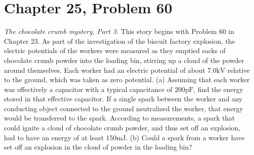 \documentclass[12pt]{article}
\begin{document}
\section{Chapter 25, Problem 60}
\textit{The chocolate crumb mystery, Part 3.} This story begins with Problem 60 in Chapter 23. As part of the investigation of the biscuit factory explosion, the electric potentials of the workers were measured as they emptied sacks of chocolate crumb powder into the loading bin, stirring up a cloud of the powder around themselves. Each worker had an electric potential of about $7.0 \unit{\kilo\volt}$ relative to the ground, which was taken as zero potential. (a) Assuming that each worker was effectively a capacitor with a typical capacitance of $200 \unit{\pico\farad}$, find the energy stored in that effective capacitor. If a single spark between the worker and any conducting object connected to the ground neutralized the worker, that energy would be transferred to the spark. According to measurements, a spark that could ignite a cloud of chocolate crumb powder, and thus set off an explosion, had to have an energy of at least $150 \unit{\milli\joule}$. (b) Could a spark from a worker have set off an explosion in the cloud of powder in the loading bin?
\end{document}
